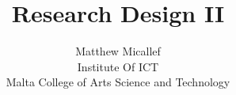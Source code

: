 \documentclass[journal]{IEEEtran}
\begin{document}
\title{Research Design II }

\author{Matthew Micallef\\
Institute Of ICT\\
Malta College of Arts Science and Technology}

% 
%




% 












\maketitle
\end{document}

